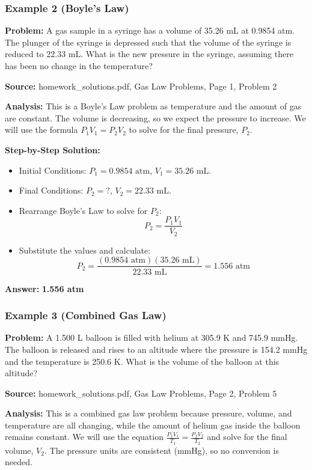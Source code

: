 \documentclass{article}
\begin{document}
\subsubsection{Example 2 (Boyle's Law)}
\textbf{Problem:} A gas sample in a syringe has a volume of 35.26 mL at 0.9854 atm. The plunger of the syringe is depressed such that the volume of the syringe is reduced to 22.33 mL. What is the new pressure in the syringe, assuming there has been no change in the temperature?

\textbf{Source:} homework\_solutions.pdf, Gas Law Problems, Page 1, Problem 2

\textbf{Analysis:} This is a Boyle's Law problem as temperature and the amount of gas are constant. The volume is decreasing, so we expect the pressure to increase. We will use the formula $P_1V_1 = P_2V_2$ to solve for the final pressure, $P_2$.

\textbf{Step-by-Step Solution:}
\begin{itemize}
    \item Initial Conditions: $P_1 = 0.9854 \text{ atm}$, $V_1 = 35.26 \text{ mL}$.
    \item Final Conditions: $P_2 = ?$, $V_2 = 22.33 \text{ mL}$.
    \item Rearrange Boyle's Law to solve for $P_2$:
    \[ P_2 = \frac{P_1 V_1}{V_2} \]
    \item Substitute the values and calculate:
    \[ P_2 = \frac{(0.9854 \text{ atm})(35.26 \text{ mL})}{22.33 \text{ mL}} = 1.556 \text{ atm} \]
\end{itemize}
\textbf{Answer:} \textbf{1.556 atm}

\subsubsection{Example 3 (Combined Gas Law)}
\textbf{Problem:} A 1.500 L balloon is filled with helium at 305.9 K and 745.9 mmHg. The balloon is released and rises to an altitude where the pressure is 154.2 mmHg and the temperature is 250.6 K. What is the volume of the balloon at this altitude?

\textbf{Source:} homework\_solutions.pdf, Gas Law Problems, Page 2, Problem 5

\textbf{Analysis:} This is a combined gas law problem because pressure, volume, and temperature are all changing, while the amount of helium gas inside the balloon remains constant. We will use the equation $\frac{P_1V_1}{T_1} = \frac{P_2V_2}{T_2}$ and solve for the final volume, $V_2$. The pressure units are consistent (mmHg), so no conversion is needed.
\end{document}
